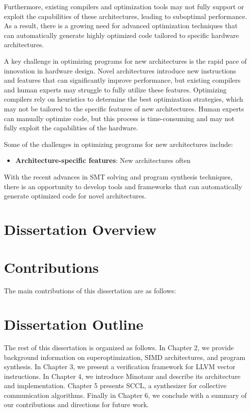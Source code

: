 Furthermore, existing compilers and optimization tools may not fully
support or exploit the capabilities of these architectures, leading to
suboptimal performance. As a result, there is a growing need for
advanced optimization techniques that can automatically generate
highly optimized code tailored to specific hardware architectures.

A key challenge in optimizing programs for new architectures is the
rapid pace of innovation in hardware design. Novel architectures
introduce new instructions and features that can significantly improve
performance, but existing compilers and human experts may
struggle to fully utilize these features. Optimizing compilers rely on
heuristics to determine the best optimization strategies, which may not
be tailored to the specific features of new architectures. Human
experts can manually optimize code, but this process is time-consuming
and may not fully exploit the capabilities of the hardware.






Some of the challenges in optimizing programs for new architectures
include:

\begin{itemize}
\item \textbf{Architecture-specific features}: New architectures often
\end{itemize}


With the recent advances in SMT solving and program synthesis
techniques, there is an opportunity to develop tools and frameworks
that can automatically generate optimized code for novel
architectures.


\section{Dissertation Overview}



\section{Contributions}

The main contributions of this dissertation are as follows:

\section{Dissertation Outline}

The rest of this dissertation is organized as follows. In Chapter 2, we
provide background information on superoptimization, SIMD architectures,
and program synthesis. In Chapter 3, we present a verification framework
for LLVM vector instructions. In Chapter 4, we introduce Minotaur and
describe its architecture and implementation. Chapter 5 presents SCCL,
a synthesizer for collective communication algorithms. Finally in Chapter
6, we conclude with a summary of our contributions and directions for
future work.





